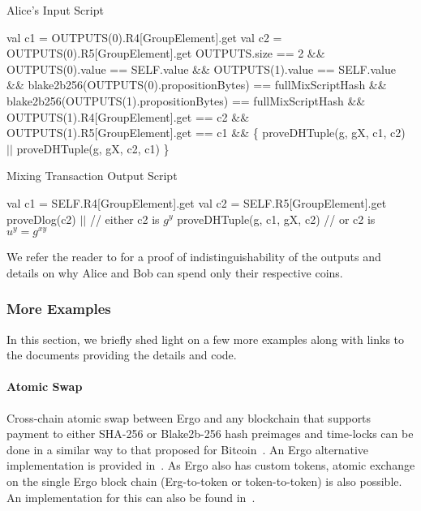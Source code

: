  \begin{algorithm}[H]
    \caption{Alice's Input Script}
    \label{alg:alice}
    \begin{algorithmic}[1]
        \State val c1 = OUTPUTS(0).R4[GroupElement].get
        \State val c2 = OUTPUTS(0).R5[GroupElement].get
        \State
        \State OUTPUTS.size == 2 \&\&
        \State OUTPUTS(0).value == SELF.value \&\&
        \State OUTPUTS(1).value == SELF.value \&\&
        \State blake2b256(OUTPUTS(0).propositionBytes) == fullMixScriptHash \&\&
        \State blake2b256(OUTPUTS(1).propositionBytes) == fullMixScriptHash \&\&
        \State OUTPUTS(1).R4[GroupElement].get == c2 \&\&
        \State OUTPUTS(1).R5[GroupElement].get == c1 \&\& \{
        \State\hspace{\algorithmicindent}  proveDHTuple(g, gX, c1, c2) $||$
        \State\hspace{\algorithmicindent}  proveDHTuple(g, gX, c2, c1)
        \State \}
    \end{algorithmic}
 \end{algorithm}

 \begin{algorithm}[H]
    \caption{Mixing Transaction Output Script}
    \label{alg:mixing-out}
    \begin{algorithmic}[1]
        \State val c1 = SELF.R4[GroupElement].get
        \State val c2 = SELF.R5[GroupElement].get
        \State proveDlog(c2) $||$            // either c2 is $g^y$
        \State proveDHTuple(g, c1, gX, c2) // or c2 is $u^y = g^{xy}$
    \end{algorithmic}
 \end{algorithm}

 We refer the reader to \cite{ergoAdvTutorial} for a proof of indistinguishability of the outputs and details on why Alice and Bob can spend only their respective coins.


\subsubsection{More Examples}

 In this section, we briefly shed light on a few more examples along with links to the documents providing the details and code.

\paragraph{Atomic Swap}
Cross-chain atomic swap between Ergo and any blockchain that supports payment to either SHA-256 or Blake2b-256 hash preimages and time-locks can be done in a similar way to that proposed for Bitcoin~\cite{Nol13}. An Ergo alternative implementation is provided in~\cite{ergoTutorial}. As Ergo also has custom tokens, atomic exchange on the single Ergo block chain (Erg-to-token or token-to-token) is also possible. An implementation for this can also be found in~\cite{ergoTutorial}.

